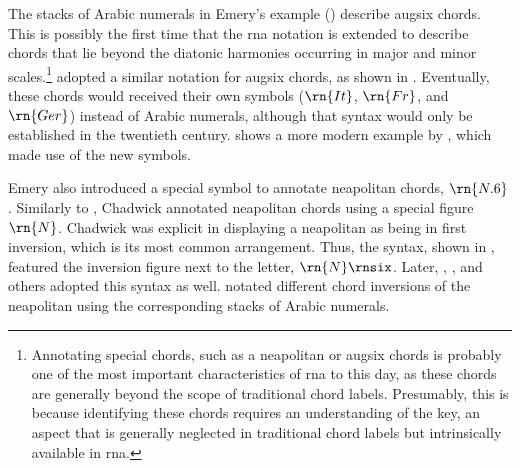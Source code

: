 


The stacks of Arabic numerals in Emery's example
() describe
\gls{augsix} chords. This is possibly the first time that
the \gls{rna} notation is extended to describe chords that
lie beyond the diatonic harmonies occurring in major and
minor scales.\footnote{Annotating special chords, such as a
\gls{neapolitan} or \gls{augsix} chords is probably one of
the most important characteristics of \gls{rna} to this day,
as these chords are generally beyond the scope of
traditional chord labels. Presumably, this is because
identifying these chords requires an understanding of the
key, an aspect that is generally neglected in traditional
chord labels but intrinsically available in \gls{rna}.}
\textcite{shepard1896harmony} adopted a similar notation for
\gls{augsix} chords, as shown in
. Eventually,
these chords would received their own symbols ($\rn{It}$,
$\rn{Fr}$, and $\rn{Ger}$) instead of Arabic numerals,
although that syntax would only be established in the
twentieth century.
 shows a more
modern example by \textcite{goldman1965harmony}, which made
use of the new symbols.



Emery also introduced a special symbol to annotate
\gls{neapolitan} chords, $\rn{N.6}$. Similarly to
\textcite{emery1879elements}, Chadwick annotated
\gls{neapolitan} chords using a special figure $\rn{N}$.
Chadwick was explicit in displaying a \gls{neapolitan} as
being in first inversion, which is its most common
arrangement. Thus, the syntax, shown in
, featured
the inversion figure next to the letter, $\rn{N}\rnsix$.
Later, \textcite{heacox1907lessons},
\textcite{alchin1921applied}, and others adopted this syntax
as well. \textcite{heacox1907lessons} notated different
chord inversions of the \gls{neapolitan} using the
corresponding stacks of Arabic numerals.

